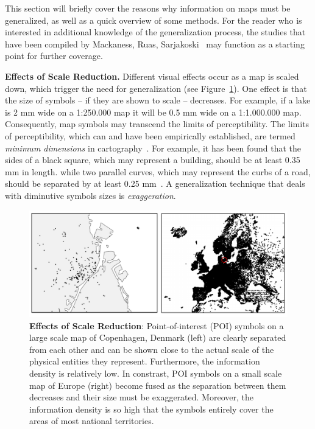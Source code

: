\documentclass[11pt, oneside]{report}
\newcommand{\minisec}[1]{\noindent\textbf{#1.}}
\begin{document}
{This section will briefly cover the reasons why information on maps must be generalized, as well as a quick overview of some methods. For the reader who is interested in additional knowledge of the generalization process, the studies that have been compiled by Mackaness, Ruas, Sarjakoski~\cite{mackaness2011generalisation} may function as a starting point for further coverage.


\minisec{Effects of Scale Reduction}
Different visual effects occur as a map is scaled down, which trigger the need for generalization (see Figure~\ref{fig:introduction:background:raw:poi}). One effect is that the size of symbols -- if they are shown to scale -- decreases. For example, if a lake is 2 mm wide on a 1:250.000 map it will be 0.5 mm wide on a 1:1.000.000 map. Consequently, map symbols may transcend the limits of perceptibility. The limits of perceptibility, which can and have been empirically established, are termed \emph{minimum dimensions} in cartography~\cite{weibel1997generalization}. For example, it has been found that the sides of a black square, which may represent a building, should be at least 0.35 mm in length. while two parallel curves, which may represent the curbs of a road, should be separated by at least 0.25 mm~\cite{ssc1977minimumdimensions}. A generalization technique that deals with diminutive symbols sizes is \emph{exaggeration}.

\begin{figure}[htbp]
\begin{center}
\includegraphics[scale=.495]{figs-thesis/data-draws-the-world.pdf}
\caption{\textbf{Effects of Scale Reduction}: Point-of-interest (POI) symbols on a large scale map of Copenhagen, Denmark (left) are clearly separated from each other and can be shown close to the actual scale of the physical entities they represent. Furthermore, the information density is relatively low. In constrast, POI symbols on a small scale map of Europe (right) become fused as the separation between them decreases and their size must be exaggerated. Moreover, the information density is so high that the symbols entirely cover the areas of most national territories.}
\label{fig:introduction:background:raw:poi}
\end{center}
\vspace*{-4ex}
\end{figure}

}
\end{document}
